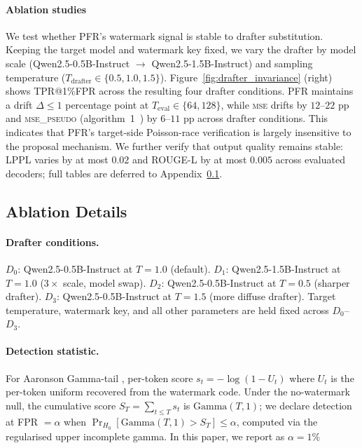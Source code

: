 \paragraph{Ablation studies}
We test whether \textsc{PFR}'s watermark signal is stable to drafter substitution.
Keeping the target model and watermark key fixed, we vary the drafter by model scale
(Qwen2.5-0.5B-Instruct $\to$ Qwen2.5-1.5B-Instruct) and sampling temperature
($T_{\mathrm{drafter}}\in\{0.5,1.0,1.5\}$). Figure~\ref{fig:drafter_invariance}
(right) shows TPR@1\%FPR across the resulting four drafter conditions.
\textsc{PFR} maintains a drift $\Delta\le 1$ percentage point at
$T_{\mathrm{eval}}\in\{64,128\}$, while \textsc{mse} drifts by $12$--$22$ pp
and \textsc{mse\_pseudo} (algorithm~1~\citep{he2026improving})
by $6$--$11$ pp across drafter conditions.
This indicates that PFR's target-side Poisson-race verification is largely insensitive
to the proposal mechanism. We further verify that output quality remains stable:
LPPL varies by at most $0.02$ and ROUGE-L by at most $0.005$ across evaluated decoders;
full tables are deferred to Appendix~\ref{app:ablation}.


\subsection{Ablation Details}
\label{app:ablation}
\paragraph{Drafter conditions.}
$D_0$: Qwen2.5-0.5B-Instruct at $T=1.0$ (default).
$D_1$: Qwen2.5-1.5B-Instruct at $T=1.0$ ($3\!\times$ scale, model swap).
$D_2$: Qwen2.5-0.5B-Instruct at $T=0.5$ (sharper drafter).
$D_3$: Qwen2.5-0.5B-Instruct at $T=1.5$ (more diffuse drafter).
Target temperature, watermark key, and all other parameters are held
fixed across $D_0$--$D_3$.
\paragraph{Detection statistic.}
For Aaronson Gamma-tail , per-token score
$s_t = -\log(1 - U_t)$ where $U_t$ is the per-token uniform recovered
from the watermark code. Under the no-watermark null, the cumulative
score $S_T = \sum_{t \le T} s_t$ is $\mathrm{Gamma}(T, 1)$; we declare
detection at FPR $=\alpha$ when $\Pr_{H_0}[\mathrm{Gamma}(T,1)\!>\!S_T]
\le \alpha$, computed via the regularised upper incomplete gamma. In this paper, we report as $\alpha =1\%$

